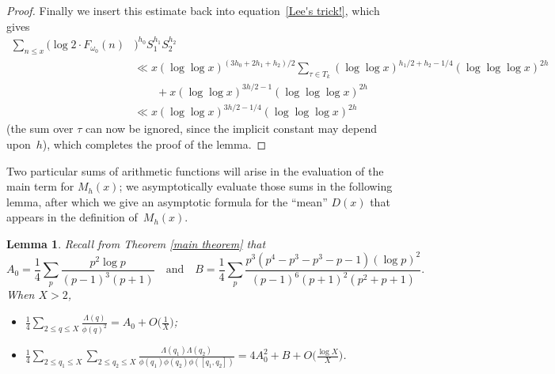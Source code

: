 \documentclass[12pt,reqno]{amsart}
\newtheorem{lemma}[theorem]{Lemma}
\theoremstyle{definition}
\begin{document}
\begin{proof}
Finally we insert this estimate back into equation~\eqref{Lee's trick!}, which gives
\begin{align*}
\sum_{n \leq x} \big( \log 2 {}\cdot F_{\omega_0}(n) & \big)^{h_0} S_1^{h_1}S_2^{h_2} \\
&\ll x (\log\log x)^{(3h_0+2h_1+h_2)/2} \sum_{\tau \in T_k} (\log\log x)^{h_1/2+h_2-1/4} (\log\log\log x)^{2h} \\
&\qquad{}+ x (\log\log x)^{3h/2 - 1} (\log\log\log x)^{2h} \\
&\ll x (\log\log x)^{3h/2-1/4} (\log\log\log x)^{2h}
\end{align*}
(the sum over $\tau$ can now be ignored, since the implicit constant may depend upon~$h$), which completes the proof of the lemma.
\end{proof}

Two particular sums of arithmetic functions will arise in the evaluation of the main term for $M_h(x)$; we asymptotically evaluate those sums in the following lemma, after which we give an asymptotic formula for the ``mean'' $D(x)$ that appears in the definition of~$M_h(x)$.

\begin{lemma}\label{infinitesums}
Recall from Theorem \ref{main theorem} that
\[
A_0 = \frac{1}{4} \sum_{p} \frac{p^2 \log p}{(p - 1)^3(p + 1)} \quad\text{and}\quad B = \frac14 \sum_p \frac{p^3(p^4 - p^3 - p^3 - p - 1)(\log p)^2}{(p - 1)^6(p + 1)^2(p^2 + p + 1)}.
\]
When $X>2$,
\begin{itemize}
\item[(a)] $\displaystyle \frac{1}{4}\sum_{2 \leq q \leq X} \frac{\Lambda(q)}{\phi(q)^2} = A_0 + O\bigg( \frac{1}{X} \bigg)$;
\item[(b)] $\displaystyle \frac{1}{4} \sum_{2 \leq q_1 \leq X}\sum_{2 \leq  q_2 \leq X} \frac{\Lambda(q_1)\Lambda(q_2)}{\phi(q_1)\phi(q_2)\phi([q_1, q_2])} = 4A_0^2 + B + O\bigg(\frac{\log X}{X}\bigg)$.
\end{itemize}
\end{lemma}
\end{document}
